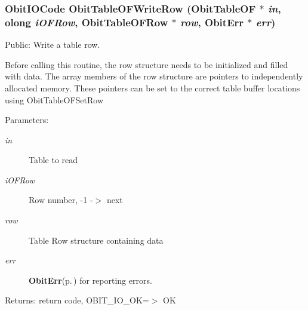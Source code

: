 \subsubsection{\setlength{\rightskip}{0pt plus 5cm}Obit\-IOCode Obit\-Table\-OFWrite\-Row ({\bf Obit\-Table\-OF} $\ast$ {\em in}, {\bf olong} {\em i\-OFRow}, {\bf Obit\-Table\-OFRow} $\ast$ {\em row}, {\bf Obit\-Err} $\ast$ {\em err})}\label{ObitTableOF_8c_a24}


Public: Write a table row. 

Before calling this routine, the row structure needs to be initialized and filled with data. The array members of the row structure are pointers to independently allocated memory. These pointers can be set to the correct table buffer locations using Obit\-Table\-OFSet\-Row \begin{Desc}
\item[Parameters:]
\begin{description}
\item[{\em in}]Table to read \item[{\em i\-OFRow}]Row number, -1 -$>$ next \item[{\em row}]Table Row structure containing data \item[{\em err}]{\bf Obit\-Err}{\rm (p.\,\pageref{structObitErr})} for reporting errors. \end{description}
\end{Desc}
\begin{Desc}
\item[Returns:]return code, OBIT\_\-IO\_\-OK=$>$ OK \end{Desc}
